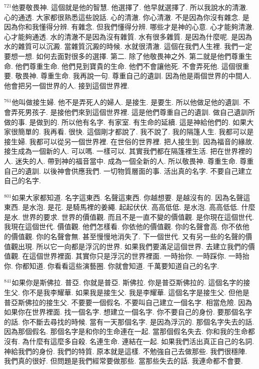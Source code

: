 \documentclass{book}
\begin{document}
$^{721}$他要敬畏神.
這個就是他的智慧.
他選擇了.
他早就選擇了.
所以我說水的清澈.
心的通透.
大家都很熟悉這些說話.
心的清澈.
你心清澈.
不是因為你沒有雜念.
是因為你和我懂得分辨.
有雜念.
但我們懂得分辨.
哪些才是神的心意.
心才能夠清澈.
心才能夠通透.
水的清澈不是因為沒有雜質.
水有很多雜質.
是因為什麼呢.
是因為水的雜質可以沉澱.
當雜質沉澱的時候.
水就很清澈.
這個在我們人生裡.
我們一定要想一想.
如何去面對很多的選擇.
第二.
除了他敬畏神之外.
第二就是他們尊重生命.
他們尊重生命.
他們見到寶貴的生命.
他們不會讓他死.
不會弄死他.
這個很重要.
敬畏神.
尊重生命.
我再說一句.
尊重自己的遺訓.
因為他是兩個世界的中間人.
他會把另一個世界的人.
接到這個世界裡.

$^{761}$他叫做接生婦.
他不是弄死人的婦人.
是接生.
是要生.
所以他做足他的遺訓.
不會弄死男孩子.
是接他們來到這個世界裡.
這是他們尊重自己的遺訓.
做自己遺訓所做的事.
是做到的.
所以他有名字.
有家室.
有生命的延續.
這是神給他們的.
如果大家很簡單的.
我再看.
很快.
這個剛才都說了.
我不說了.
我的隔篷人生.
我都可以是接生婦.
我都可以從另一個世界裡.
在世俗的世界裡.
把人接生到.
因為福音的緣故.
接生成為一個新的人.
可以嗎.
一樣可以.
其實我們都在隔篷裡生活.
把在世界裡的人.
迷失的人.
帶到神的福音當中.
成為一個全新的人.
所以敬畏神.
尊重生命.
尊重自己的遺訓.
以後神會供應我們.
一切物質層面的事.
活出真的名字.
不要自己建立自己的名字.

$^{801}$如果大家都知道.
名字這東西.
名聲這東西.
你越想要.
是越沒有的.
因為名聲這東西.
是水泡.
是花.
是騎馬裡的姜繩.
起起伏伏.
高高低低.
是水泡.
高高低低.
什麼是水.
世界的要求.
世界的價值觀.
而且不是一直不變的價值觀.
是你現在這個世代.
我現在這個世代.
價值觀.
他們怎樣看.
你依他的價值觀.
你的名聲會高.
你不依他的價值觀.
你的名聲會無.
甚至慢慢地消失了.
下一個世代.
又有另一些的名聲的價值觀出現.
所以它一向都是浮沉的世界.
如果我們要滿足這個世界.
去建立我們的價值觀.
在這個世界裡面.
其實你只是浮沉的世界裡面.
一時抬你.
一時踩你.
一時抬你.
你都知道.
你看看這些演藝圈.
你就會知道.
千萬要知道自己的名字.

$^{841}$如果你是斯佛拉.
普亞.
你就是普亞.
斯佛拉.
你是普亞斯佛拉的.
這個名字的接生父.
你不是我李耀華.
如果我是接生父.
我是李耀華.
這個名字是接生父.
但他是普亞斯佛拉的接生父.
不要要一個假名.
不要叫自己建立一個名字.
相當危險.
因為如果你在世界裡面.
找一個名字.
想建立一個名字.
你不要自己的身份.
要那個名字的話.
你不斷去尋找的時候.
當有一天那個名字.
是因為浮沉的.
那個名字失去的話.
因為那個假名.
那個名字是和你的生命連在一起.
當那個假名失去.
你和我的生命都沒有.
為什麼有這麼多自殺.
名連生命.
連結在一起.
如果我們活出真正自己的名詞.
神給我們的身份.
我們的特質.
原本就是這樣.
不勉強自己去做那些.
我們很穩陣.
我們真的很好.
但問題是我們經常要做那些.
當那些失去的話.
我連命都不會要.
\end{document}
